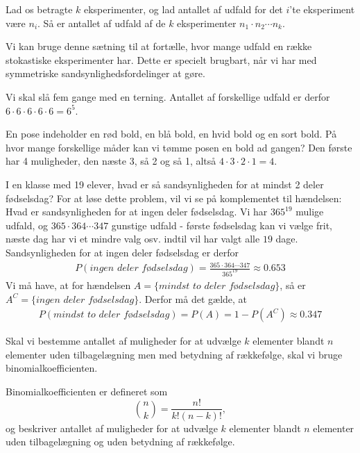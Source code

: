 \begin{setn}[Multiplikationsprincippet]
Lad os betragte $k$ eksperimenter, og lad antallet af udfald for det $i$'te eksperiment være $n_i$. Så er antallet af udfald af de $k$ eksperimenter $n_1\cdot n_2\cdots n_k.$
\end{setn}
Vi kan bruge denne sætning til at fortælle, hvor mange udfald en række stokastiske eksperimenter har. Dette er specielt brugbart, når vi har med symmetriske sandsynlighedsfordelinger at gøre. 
\begin{exa}
Vi skal slå fem gange med en terning. Antallet af forskellige udfald er derfor $6\cdot 6 \cdot 6\cdot 6\cdot 6 = 6^5$.
\end{exa}
\begin{exa}
En pose indeholder en rød bold, en blå bold, en hvid bold og en sort bold. På hvor mange forskellige måder kan vi tømme posen en bold ad gangen? Den første har 4 muligheder, den næste 3, så 2 og så 1, altså $4\cdot 3 \cdot 2 \cdot 1 = 4\!$.
\end{exa}
\begin{exa}
I en klasse med 19 elever, hvad er så sandsynligheden for at mindst 2 deler fødselsdag? For at løse dette problem, vil vi se på komplementet til hændelsen: Hvad er sandsynligheden for at ingen deler fødselsdag. Vi har $365^{19}$ mulige udfald, og $365\cdot 364 \cdots 347$ gunstige udfald - første fødselsdag kan vi vælge frit, næste dag har vi et mindre valg osv. indtil vil har valgt alle $19$ dage.
Sandsynligheden for at ingen deler fødselsdag er derfor
\begin{align*}
P(\textit{ingen deler fødselsdag}) = \frac{365\cdot 364 \cdots 347}{365^{19}} \approx 0.653
\end{align*}
Vi må have, at for hændelsen $A= \{\textit{mindst to deler fødselsdag}\}$, så er $A^C = \{\textit{ingen deler fødselsdag}\}$. Derfor må det gælde, at 
\begin{align*}
P(\textit{mindst to deler fødselsdag}) = P(A) = 1-P(A^C) \approx 0.347
\end{align*}
\end{exa}
Skal vi bestemme antallet af muligheder for at udvælge $k$ elementer blandt $n$ elementer uden tilbagelægning men med betydning af rækkefølge, skal vi bruge binomialkoefficienten. 
\begin{defn}
Binomialkoefficienten er defineret som \[
\binom{n}{k} = \frac{n!}{k!(n-k)!},
\]
og beskriver antallet af muligheder for at udvælge $k$ elementer blandt $n$ elementer uden tilbagelægning og uden betydning af rækkefølge.
\end{defn}
